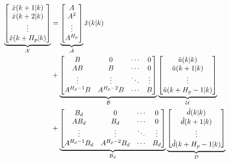 \begin{equation}\label{eq:lifted_state_equation}
\begin{aligned}
	  \underbrace{\begin{bmatrix}
	  \hat{x}(k+1|k) 	\\
	  \hat{x}(k+2|k) 	\\
	  \vdots 			\\
	  \hat{x}(k+H_p|k) 	\\
	   \end{bmatrix}}_{\CMcal{X}}
	 &=
	\underbrace{\begin{bmatrix}
		A \\
		A^2 \\
		\vdots \\
		A^{H_p} \\
	\end{bmatrix}}_{\CMcal{A}}
	\hat{x}(k|k) \\&+
	\underbrace{\begin{bmatrix}
		B 		 &0			 &\cdots	& 0		\\
		AB  	 &B  		 & \cdots& 0		\\
		\vdots 	 &\vdots	 & \ddots&\vdots	\\
		A^{H_p-1}B&A^{H_p-2}B&\cdots &B 
    \end{bmatrix}}_{\CMcal{B}}
    	\underbrace{\begin{bmatrix}
	\hat{u}(k|k)\\
	\hat{u}(k+1|k)\\
	\vdots\\
	\hat{u}(k+H_p-1|k)
	\end{bmatrix}}_{\CMcal{U}} \\ &+ 
    \underbrace{\begin{bmatrix}
    	B_d 	    &0	         &\cdots & 0		\\
		AB_d  	    &B_d  	     & \cdots& 0		\\
		\vdots 	    &\vdots	     & \ddots&\vdots	\\
		A^{H_p-1}B_d&A^{H_p-2}B_d&\cdots &B_d 
	  \end{bmatrix}}_{\CMcal{B}_d} 
	\underbrace{\begin{bmatrix}
	\hat{d}(k|k)\\
	\hat{d}(k+1|k)\\
	\vdots\\
	\hat{d}(k+H_p-1|k)
	\end{bmatrix}}_{\CMcal{D}}
	\end{aligned}
\end{equation}


